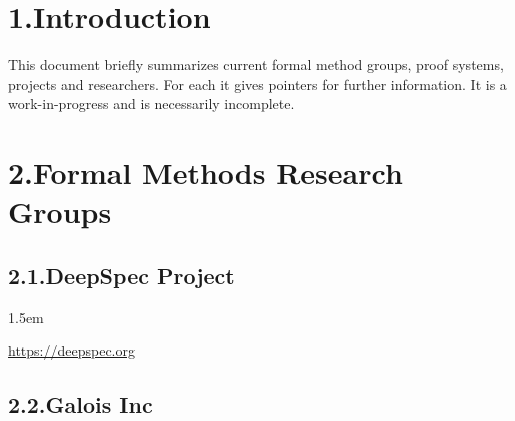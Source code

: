 \documentclass[12pt,twoside]{article}
\begin{document}
\section{1.\hspace*{0.5em}Introduction}\label{sec-introduction}%

\noindent{}This document briefly summarizes current formal method groups, proof
systems, projects and researchers. For each it gives pointers for
further information. It is a work-in-progress and is necessarily
incomplete.%

\section{2.\hspace*{0.5em}Formal Methods Research Groups}\label{sec-formal-methods-research-groups}%

\subsection{2.1.\hspace*{0.5em}DeepSpec Project}\label{sec-deepspec-project}%

\begin{mddefinitions}%


\begin{mdbmarginx}{}{}{}{1.5em}%
\begin{mddefdata}%
\href{https://deepspec.org}{{\ttfamily https://\hspace{0pt}deepspec.\hspace{0pt}org}}%
\end{mddefdata}%
\end{mdbmarginx}%
\end{mddefinitions}%

\subsection{2.2.\hspace*{0.5em}Galois Inc}\label{sec-galois-inc}%
\end{document}
